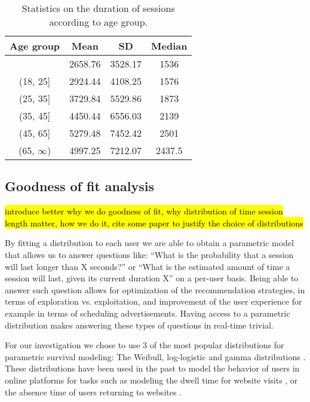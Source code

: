 \begin{table}
	\begin{center}
	\begin{tabular}{|c|c|c|c|}
		\hline
		Age group & \textbf{Mean} & \textbf{SD} & \textbf{Median} \\
		\hline 
		[0, 18] & 2658.76 & 3528.17 & 1536 \\ 
		\hline 
		(18, 25] & 2924.44 & 4108.25 & 1576 \\ 
		\hline 
		(25, 35] & 3729.84 & 5529.86 & 1873 \\ 
		\hline 
		(35, 45] & 4450.44 & 6556.03 & 2139 \\ 
		\hline 
		(45, 65] & 5279.48 & 7452.42 & 2501 \\ 
		\hline 
		(65, $\infty$) & 4997.25 & 7212.07 & 2437.5 \\ 
		\hline 
	\end{tabular} 
	\caption{Statistics on the duration of sessions according to age group.}
	\label{table:age}
	\end{center}
\end{table}

\subsection{Goodness of fit analysis} %
\hl{introduce better why we do goodness of fit, why distribution of time session length matter, how we do it, cite some paper to justify the choice of distributions}

By fitting a distribution to each user we are able to obtain a parametric model that allows
us to answer questions like: ``What is the probability that a session will last longer
than X seconds?'' or ``What is the estimated amount of time a session will last, given its current
duration X'' on a per-user basis.
Being able to answer such question allows for optimization of the recommendation strategies,
in terms of exploration vs. exploitation, and improvement of the user experience for example in
terms of scheduling advertisements.
Having access to a parametric distribution makes answering these types
of questions in real-time trivial.


For our investigation we chose to use 3 of the most popular distributions for parametric
survival modeling: The Weibull, log-logistic and gamma distributions \cite{kleinbaum2005}.
These distributions have been used in the past to model the behavior of users in online
platforms for tasks such as modeling the dwell time for website visits \cite{liu2010weibull}, or
the absence time of users returning to websites \cite{dupret2013absence}. %

